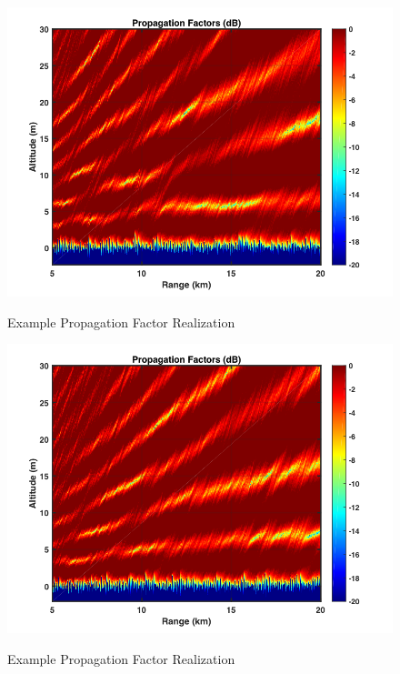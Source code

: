 \begin{figure}[H]
  \begin{center}
\includegraphics[width=5in]{../media/statistics/pf_1.png}
  \end{center}
  \renewcommand{\baselinestretch}{1} \small\normalsize
  \begin{quote}
    \caption[Example Propagation Factor Realization]{Example Propagation Factor Realization\label{stat_fig:1a}}
  \end{quote}
\end{figure}
\renewcommand{\baselinestretch}{2} \small\normalsize

\begin{figure}[H]
  \begin{center}
\includegraphics[width=5in]{../media/statistics/pf_2.png}
  \end{center}
  \renewcommand{\baselinestretch}{1} \small\normalsize
  \begin{quote}
    \caption[Example Propagation Factor Realization]{Example Propagation Factor Realization\label{stat_fig:1b}}
  \end{quote}
\end{figure}
\renewcommand{\baselinestretch}{2} \small\normalsize

